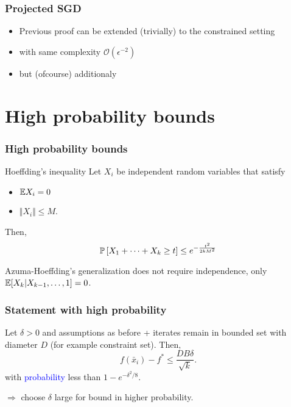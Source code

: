 \documentclass{beamer}
\begin{document}
\begin{frame}
  \frametitle{Projected SGD}

  \begin{itemize}
    \item Previous proof can be extended (trivially) to the constrained setting
    \item with same complexity $\mathcal{O}(\epsilon^{-2})$
    \item but (ofcourse) additionaly
  \end{itemize}

\end{frame}

\section{High probability bounds}%
\label{sec:}

\begin{frame}
  \frametitle{High probability bounds}

  \begin{theorem}{Hoeffding's inequality}
    Let $X_i$ be independent random variables that satisfy
    \begin{itemize}
      \item $\E X_i = 0$
      \item $\Vert X_i \Vert \le M$.
    \end{itemize}
    Then,
    \begin{equation}
      \P\left[ X_1+ \dots + X_k \ge t\right] \le e^{-\frac{t^2}{2kM^2}}
    \end{equation}
  \end{theorem}

  Azuma-Hoeffding's generalization does not require independence, only $\E[X_k| X_{k-1}, \dots, 1]=0$.
\end{frame}


\begin{frame}
  \frametitle{Statement with high probability}
  \begin{theorem}
    Let $\delta>0$ and assumptions as before + iterates remain in bounded set with diameter $D$ (for example constraint set). Then,
    \begin{equation}
       f(\bar{x}_i) - f^* \le \frac{D B \delta}{\sqrt{k}}.
    \end{equation}
    with \textcolor{blue}{probability} less than $1-e^{-\delta^2/8}$.
  \end{theorem}
  $\Rightarrow$ choose $\delta$ large for bound in higher probability.
\end{frame}
\end{document}
